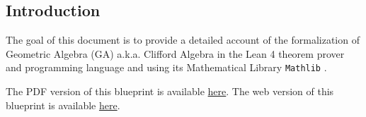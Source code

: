 \subsection*{Introduction}
\label{sec:intro}

The goal of this document is to provide a detailed account
of the formalization of Geometric Algebra (GA) a.k.a. Clifford Algebra \cite{hestenes2012clifford}
in the Lean 4 theorem prover and programming language \cite{moura2021lean, lean_2015, ullrich2023extensible}
and using its Mathematical Library \texttt{Mathlib} \cite{themathlibcommunityLeanMathematicalLibrary2020}.

\ifplastex
The PDF version of this blueprint is available \href{./blueprint.pdf}{here}.
\else
The web version of this blueprint is available \href{https://utensil.github.io/lean-ga/blueprint/}{here}.
\fi





